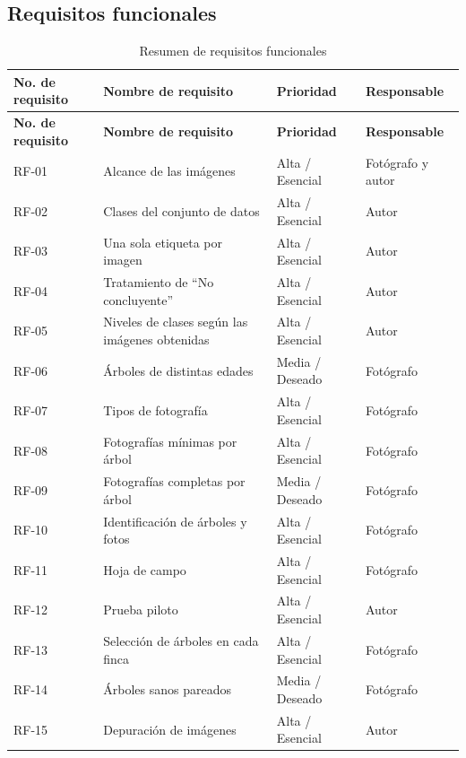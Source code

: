 \documentclass[11pt]{article}
\begin{document}
\subsection{Requisitos funcionales}
{\small
\begin{longtable}{|>{\RaggedRight\arraybackslash}p{2.27cm}|>{\RaggedRight\arraybackslash}p{6.05cm}|>{\RaggedRight\arraybackslash}p{3.02cm}|>{\RaggedRight\arraybackslash}p{3.02cm}|}
\caption{Resumen de requisitos funcionales}\\
\hline
\rowcolor{encabezado}\textbf{No. de requisito} & \textbf{Nombre de requisito} & \textbf{Prioridad} & \textbf{Responsable} \\ \hline
\endfirsthead
\hline
\rowcolor{encabezado}\textbf{No. de requisito} & \textbf{Nombre de requisito} & \textbf{Prioridad} & \textbf{Responsable} \\ \hline
\endhead
RF-01 & Alcance de las imágenes & Alta / Esencial & Fotógrafo y autor \\ \hline
RF-02 & Clases del conjunto de datos & Alta / Esencial & Autor \\ \hline
RF-03 & Una sola etiqueta por imagen & Alta / Esencial & Autor \\ \hline
RF-04 & Tratamiento de “No concluyente” & Alta / Esencial & Autor \\ \hline
RF-05 & Niveles de clases según las imágenes obtenidas & Alta / Esencial & Autor \\ \hline
RF-06 & Árboles de distintas edades & Media / Deseado & Fotógrafo \\ \hline
RF-07 & Tipos de fotografía & Alta / Esencial & Fotógrafo \\ \hline
RF-08 & Fotografías mínimas por árbol & Alta / Esencial & Fotógrafo \\ \hline
RF-09 & Fotografías completas por árbol & Media / Deseado & Fotógrafo \\ \hline
RF-10 & Identificación de árboles y fotos & Alta / Esencial & Fotógrafo \\ \hline
RF-11 & Hoja de campo & Alta / Esencial & Fotógrafo \\ \hline
RF-12 & Prueba piloto & Alta / Esencial & Autor \\ \hline
RF-13 & Selección de árboles en cada finca & Alta / Esencial & Fotógrafo \\ \hline
RF-14 & Árboles sanos pareados & Media / Deseado & Fotógrafo \\ \hline
RF-15 & Depuración de imágenes & Alta / Esencial & Autor \\ \hline

\end{longtable}}
\end{document}
